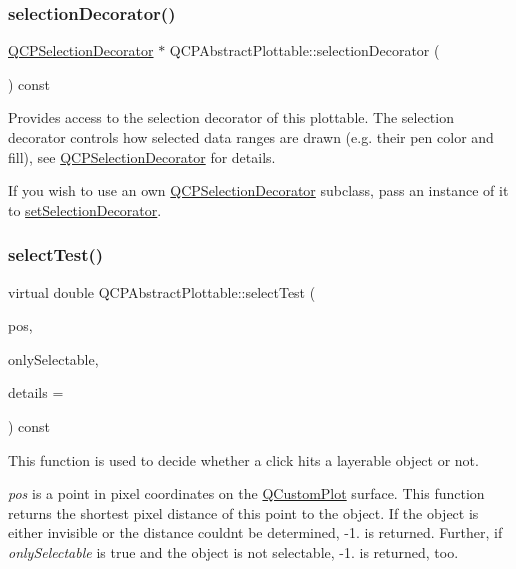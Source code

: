 \subsubsection{\texorpdfstring{selection\+Decorator()}{selectionDecorator()}}
{\footnotesize\ttfamily \hyperlink{class_q_c_p_selection_decorator}{Q\+C\+P\+Selection\+Decorator} $\ast$ Q\+C\+P\+Abstract\+Plottable\+::selection\+Decorator (\begin{DoxyParamCaption}{ }\end{DoxyParamCaption}) const\hspace{0.3cm}{\ttfamily [inline]}}

Provides access to the selection decorator of this plottable. The selection decorator controls how selected data ranges are drawn (e.\+g. their pen color and fill), see \hyperlink{class_q_c_p_selection_decorator}{Q\+C\+P\+Selection\+Decorator} for details.

If you wish to use an own \hyperlink{class_q_c_p_selection_decorator}{Q\+C\+P\+Selection\+Decorator} subclass, pass an instance of it to \hyperlink{class_q_c_p_abstract_plottable_a20e266ad646f8c4a7e4631040510e5d9}{set\+Selection\+Decorator}. \mbox{\label{class_q_c_p_abstract_plottable_a38efe9641d972992a3d44204bc80ec1d}} 
\subsubsection{\texorpdfstring{select\+Test()}{selectTest()}\hspace{0.1cm}{\footnotesize\ttfamily [1/2]}}
{\footnotesize\ttfamily virtual double Q\+C\+P\+Abstract\+Plottable\+::select\+Test (\begin{DoxyParamCaption}\item[{const Q\+PointF \&}]{pos,  }\item[{bool}]{only\+Selectable,  }\item[{Q\+Variant $\ast$}]{details = {} }\end{DoxyParamCaption}) const\hspace{0.3cm}{\ttfamily [pure virtual]}}

This function is used to decide whether a click hits a layerable object or not.

{\itshape pos} is a point in pixel coordinates on the \hyperlink{class_q_custom_plot}{Q\+Custom\+Plot} surface. This function returns the shortest pixel distance of this point to the object. If the object is either invisible or the distance couldn\textquotesingle{}t be determined, -\/1. is returned. Further, if {\itshape only\+Selectable} is true and the object is not selectable, -\/1. is returned, too.

